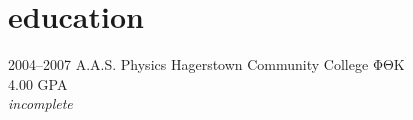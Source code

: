 \section{education}

\begin{entrylist}
  \entry
    {2004--2007}
    {A.A.S. Physics}
    {Hagerstown Community College}
    {
        ΦΘΚ\\
        4.00 GPA\\
        \emph{incomplete}\\
    }
\end{entrylist}
